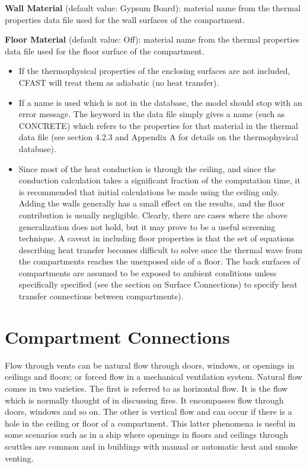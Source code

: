 \textbf{Wall Material} (default value: Gypsum Board): material name from the thermal properties data file used for the wall surfaces of the compartment.

\textbf{Floor Material} (default value: Off): material name from the thermal properties data file used for the floor surface of the compartment.

\begin{itemize}
\item If the thermophysical properties of the enclosing surfaces are not included, CFAST will treat them as adiabatic (no heat transfer).

\item If a name is used which is not in the database, the model should stop with an error message. The keyword in the data file simply gives a name (such as CONCRETE) which refers to the properties for that material in the thermal data file (see section 4.2.3 and Appendix A for details on the thermophysical database).

\item Since most of the heat conduction is through the ceiling, and since the conduction calculation takes a significant fraction of the computation time, it is recommended that initial calculations be made using the ceiling only.  Adding the walls generally has a small effect on the results, and the floor contribution is usually negligible.  Clearly, there are cases where the above generalization does not hold, but it may prove to be a useful screening technique. A caveat in including floor properties is that the set of equations describing heat transfer becomes difficult to solve once the thermal wave from the compartments reaches the unexposed side of a floor. The back surfaces of compartments are assumed to be exposed to ambient conditions unless specifically specified (see the section on Surface Connections) to specify heat transfer connections between compartments).
\end{itemize}

\newpage
\section{Compartment Connections}

Flow through vents can be natural flow through doors, windows, or openings in ceilings and floors; or forced flow in a mechanical ventilation system.  Natural flow comes in two varieties.  The first is referred to as horizontal flow.  It is the flow which is normally thought of in discussing fires.  It encompasses flow through doors, windows and so on.  The other is vertical flow and can occur if there is a hole in the ceiling or floor of a compartment.  This latter phenomena is useful in some scenarios such as in a ship where openings in floors and ceilings through scuttles are common and in buildings with manual or automatic heat and smoke venting.

